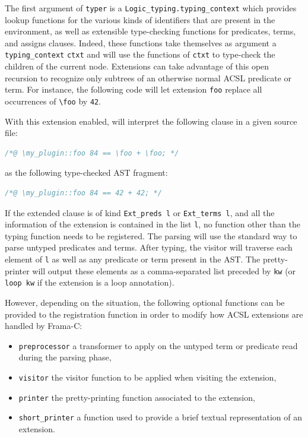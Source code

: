 The first argument of \verb|typer| is a \verb|Logic_typing.typing_context|%
 which provides lookup functions for the
various kinds of identifiers that are present in the environment, as well as
extensible type-checking functions for predicates, terms, and assigns clauses.
Indeed, these functions take themselves as argument a \verb|typing_context|
\verb|ctxt| and will use the functions of \verb|ctxt| to type-check the children
of the current node. Extensions can take advantage of this open recursion to
recognize only subtrees of an otherwise normal ACSL predicate or term. For
instance, the following code will let extension \verb|foo| replace all
occurrences of \verb|\foo| by \verb|42|.


With this extension enabled, \framac will interpret the following clause in
a given source file:
\begin{lstlisting}[language=C,alsolanguage=ACSL]
/*@ \my_plugin::foo 84 == \foo + \foo; */
\end{lstlisting}
as the following type-checked AST fragment:
\begin{lstlisting}[language=C,alsolanguage=ACSL]
/*@ \my_plugin::foo 84 == 42 + 42; */
\end{lstlisting}

If the extended clause is of kind \verb|Ext_preds l| or \verb|Ext_terms l|,
and all the information of the extension is contained in the list \verb|l|,
no function other than the typing function needs to be registered. The parsing
will use the standard way to parse untyped predicates and terms. After
typing, the visitor will traverse each element of \verb|l| as well as any
predicate or term present in the AST. The pretty-printer will output these
elements as a comma-separated list preceded by \verb|kw| (or \verb|loop kw| if
the extension is a loop annotation).

However, depending on the situation, the following optional functions can be
provided to the registration function in order to modify how ACSL extensions
are handled by Frama-C:

\begin{itemize}
\item \texttt{preprocessor} a transformer to apply on the untyped term or
  predicate read during the parsing phase,
\item \texttt{visitor} the visitor function to be applied when visiting
  the extension,
\item \texttt{printer} the pretty-printing function associated to the
  extension,
\item \texttt{short\_printer} a function used to provide a brief textual
  representation of an extension.
\end{itemize}

